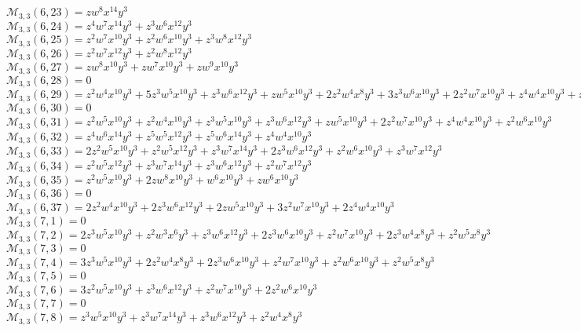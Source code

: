 \documentclass[12pt]{memoireuqam1.3}
\begin{document}
$\mathcal{M}_{3,3}(6,23)=zw^8x^{14}y^3$\\
$\mathcal{M}_{3,3}(6,24)=z^4w^7x^{14}y^3+z^3w^6x^{12}y^3$\\
$\mathcal{M}_{3,3}(6,25)=z^2w^7x^{10}y^3+z^2w^6x^{10}y^3+z^3w^8x^{12}y^3$\\
$\mathcal{M}_{3,3}(6,26)=z^2w^7x^{12}y^3+z^2w^8x^{12}y^3$\\
$\mathcal{M}_{3,3}(6,27)=zw^8x^{10}y^3+zw^7x^{10}y^3+zw^9x^{10}y^3$\\
$\mathcal{M}_{3,3}(6,28)=0$\\
$\mathcal{M}_{3,3}(6,29)=z^2w^4x^{10}y^3+5z^3w^5x^{10}y^3+z^3w^6x^{12}y^3+zw^5x^{10}y^3+2z^2w^4x^8y^3+3z^3w^6x^{10}y^3+2z^2w^7x^{10}y^3+z^4w^4x^{10}y^3+z^2w^5x^8y^3$\\
$\mathcal{M}_{3,3}(6,30)=0$\\
$\mathcal{M}_{3,3}(6,31)=z^2w^5x^{10}y^3+z^2w^4x^{10}y^3+z^3w^5x^{10}y^3+z^3w^6x^{12}y^3+zw^5x^{10}y^3+2z^2w^7x^{10}y^3+z^4w^4x^{10}y^3+z^2w^6x^{10}y^3$\\
$\mathcal{M}_{3,3}(6,32)=z^4w^6x^{14}y^3+z^5w^5x^{12}y^3+z^5w^6x^{14}y^3+z^4w^4x^{10}y^3$\\
$\mathcal{M}_{3,3}(6,33)=2z^2w^5x^{10}y^3+z^2w^5x^{12}y^3+z^3w^7x^{14}y^3+2z^3w^6x^{12}y^3+z^2w^6x^{10}y^3+z^3w^7x^{12}y^3$\\
$\mathcal{M}_{3,3}(6,34)=z^2w^5x^{12}y^3+z^3w^7x^{14}y^3+z^3w^6x^{12}y^3+z^2w^7x^{12}y^3$\\
$\mathcal{M}_{3,3}(6,35)=z^2w^5x^{10}y^3+2zw^8x^{10}y^3+w^6x^{10}y^3+zw^6x^{10}y^3$\\
$\mathcal{M}_{3,3}(6,36)=0$\\
$\mathcal{M}_{3,3}(6,37)=2z^2w^4x^{10}y^3+2z^3w^6x^{12}y^3+2zw^5x^{10}y^3+3z^2w^7x^{10}y^3+2z^4w^4x^{10}y^3$\\
$\mathcal{M}_{3,3}(7,1)=0$\\
$\mathcal{M}_{3,3}(7,2)=2z^3w^5x^{10}y^3+z^2w^3x^6y^3+z^3w^6x^{12}y^3+2z^3w^6x^{10}y^3+z^2w^7x^{10}y^3+2z^3w^4x^8y^3+z^2w^5x^8y^3$\\
$\mathcal{M}_{3,3}(7,3)=0$\\
$\mathcal{M}_{3,3}(7,4)=3z^3w^5x^{10}y^3+2z^2w^4x^8y^3+2z^3w^6x^{10}y^3+z^2w^7x^{10}y^3+z^2w^6x^{10}y^3+z^2w^5x^8y^3$\\
$\mathcal{M}_{3,3}(7,5)=0$\\
$\mathcal{M}_{3,3}(7,6)=3z^2w^5x^{10}y^3+z^3w^6x^{12}y^3+z^2w^7x^{10}y^3+2z^2w^6x^{10}y^3$\\
$\mathcal{M}_{3,3}(7,7)=0$\\
$\mathcal{M}_{3,3}(7,8)=z^3w^5x^{10}y^3+z^3w^7x^{14}y^3+z^3w^6x^{12}y^3+z^2w^4x^8y^3$\\
\end{document}
